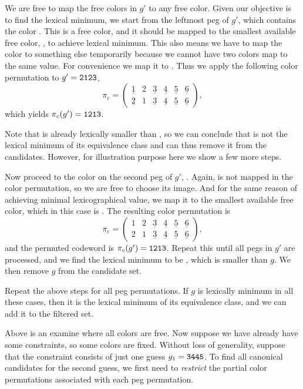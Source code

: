 We are free to map the free colors in $g'$ to any free color. Given our objective is to find the lexical minimum, we start from the leftmost peg of $g'$, which contains the color . This is a free color, and it should be mapped to the smallest available free color, , to achieve lexical minimum. This also means we have to map the color  to something else temporarily because we cannot have two colors map to the same value. For convenience we map it to . Thus we apply the following color permutation to $g' = \texttt{2123}$,
\[
\pi_c = 
\begin{pmatrix}
\underline{1} & 2 & \underline{3} & \underline{4} & \underline{5} & \underline{6} \\
\underline{2} & 1 & \underline{3} & \underline{4} & \underline{5} & \underline{6} 
\end{pmatrix} ,
\]
which yields $\pi_c(g') = \texttt{1213}$.

Note that  is already lexically smaller than , so we can conclude that  is not the lexical minimum of its equivalence class and can thus remove it from the candidates. However, for illustration purpose here we show a few more steps.

Now proceed to the color on the second peg of $g'$, . Again,  is not mapped in the color permutation, so we are free to choose its image. And for the same reason of achieving minimal lexicographical value, we map it to the smallest available free color, which in this case is . The resulting color permutation is
\[
\pi_c = 
\begin{pmatrix}
1 & 2 & \underline{3} & \underline{4} & \underline{5} & \underline{6} \\
2 & 1 & \underline{3} & \underline{4} & \underline{5} & \underline{6} 
\end{pmatrix} ,
\]
and the permuted codeword is $\pi_c(g') = \texttt{1213}$. Repeat this until all pegs in $g'$ are processed, and we find the lexical minimum to be , which is smaller than $g$. We then remove $g$ from the candidate set. 

Repeat the above steps for all peg permutations. If $g$ is lexically minimum in all these cases, then it is the lexical minimum of its equivalence class, and we can add it to the filtered set.

Above is an examine where all colors are free. Now suppose we have already have some constraints, so some colors are fixed. Without loss of generality, suppose that the constraint consists of just one guess $g_1 = \texttt{3445}$. To find all canonical candidates for the second guess, we first need to \emph{restrict} the partial color permutations associated with each peg permutation. 

